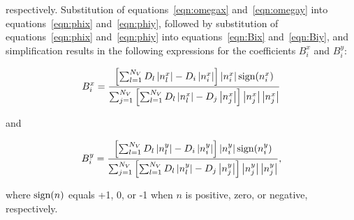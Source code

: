 \noindent respectively. Substitution of equations~\ref{eqn:omegax} and~\ref{eqn:omegay} into equations~\ref{eqn:phix} and~\ref{eqn:phiy}, followed by substitution of equations~\ref{eqn:phix} and~\ref{eqn:phiy} into equations~\ref{eqn:Bix} and~\ref{eqn:Biy}, and simplification results in the following expressions for the coefficients $B_i^x$ and $B_i^y$:

\begin{equation}
\label{eqn:bx2}
B_i^x =  \frac{\left [ \sum_{l=1}^{N_V} D_l  \left | n_l^x \right |  - D_i \left | n_i^x \right |  \right ] \left | n_i^x \right | \text{sign} (n_i^x)  }{\sum_{j=1}^{N_V} \left [ \sum_{l=1}^{N_V} D_l  \left | n_l^x \right |  - D_j \left | n_j^x \right | \right ] \left | n_j^x \right |  \left | n_j^x \right | }
\end{equation}

\noindent and

\begin{equation}
\label{eqn:bx2}
B_i^y =  \frac{\left [ \sum_{l=1}^{N_V} D_l  \left | n_l^y \right |  - D_i \left | n_i^y \right |  \right ] \left | n_i^y \right | \text{sign} (n_i^y)  }{\sum_{j=1}^{N_V} \left [ \sum_{l=1}^{N_V} D_l  \left | n_l^y \right |  - D_j \left | n_j^y \right | \right ] \left | n_j^y \right |  \left | n_j^y \right | } ,
\end{equation}

\noindent where $\text{sign} (n)$ equals +1, 0, or -1 when $n$ is positive, zero, or negative, respectively.


